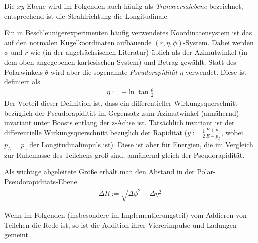 Die $xy$-Ebene wird im Folgenden auch häufig als \emph{Transversalebene}
bezeichnet, entsprechend ist die Strahlrichtung die Longitudinale.

Ein in Beschleunigerexperimenten häufig verwendetes Koordinatensystem ist das
auf den normalen Kugelkoordinaten aufbauende $(r, \eta, \phi)$-System.  Dabei
werden $\phi$ und $r$ wie (in der angelsächsischen Literatur) üblich als der
Azimutwinkel (in dem oben angegebenen kartesischen System) und Betrag gewählt.
Statt des Polarwinkels $\theta$ wird aber die sogenannte \emph{Pseudorapidität}
$\eta$ verwendet. Diese ist definiert als
\begin{align}
  \eta := -\ln{\tan{\frac \theta 2}}
\end{align}
Der Vorteil dieser Definition ist, dass ein differentieller Wirkungsquerschnitt
bezüglich der Pseudorapidität im Gegensatz zum Azimutwinkel (annähernd)
invariant unter Boosts entlang der z-Achse ist.  Tatsächlich invariant ist der
differentielle Wirkungsquerschnitt bezüglich der Rapidität ($y := \frac12
\frac{E + p_L}{E - p_L}$, wobei $p_L = p_z$ der Longitudinalimpuls ist). Diese
ist aber für Energien, die im Vergleich zur Ruhemasse des Teilchens groß sind,
annähernd gleich der Pseudorapidität.

Als wichtige abgeleitete Größe erhält man den Abstand in der
Polar-Pseudorapiditäts-Ebene
\begin{align}
  \Delta R := \sqrt{\Delta\phi^2 + \Delta\eta^2}
  \label{def:dr}
\end{align}

Wenn im Folgenden (insbesondere im Implementierungsteil) vom Addieren von
Teilchen die Rede ist, so ist die Addition ihrer Viererimpulse und Ladungen
gemeint.

